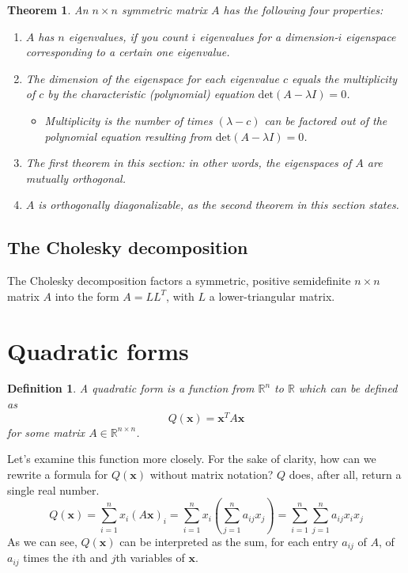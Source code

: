 \documentclass[draft,12pt]{report}
\newtheorem{theorem}{Theorem}
\newtheorem{definition}{Definition}
\renewcommand{\vec}[1]{\mathbf{#1}}
\begin{document}
\begin{theorem}
    An $n \times n$ symmetric matrix $A$ has the following four properties:
    \begin{enumerate}
        \item $A$ has $n$ eigenvalues, if you count $i$ eigenvalues for a dimension-$i$ eigenspace corresponding to a certain one eigenvalue.
        \item The dimension of the eigenspace for each eigenvalue $c$ equals the multiplicity of $c$ by the characteristic (polynomial) equation $\mathrm{det } (A - \lambda I) = 0$.
        \begin{itemize}
            \item Multiplicity is the number of times $(\lambda - c)$ can be factored out of the polynomial equation resulting from $\mathrm{det } (A - \lambda I) = 0$.
        \end{itemize}
        \item The first theorem in this section: in other words, the eigenspaces of $A$ are mutually orthogonal.
        \item $A$ is orthogonally diagonalizable, as the second theorem in this section states.
    \end{enumerate}
\end{theorem}

\subsection{The Cholesky decomposition}

The Cholesky decomposition factors a symmetric, positive semidefinite $n \times n$ matrix $A$ into the form $A = LL^T$, with $L$ a lower-triangular matrix.

\section{Quadratic forms}

\begin{definition}
    A quadratic form is a function from $\mathbb R^n$ to $\mathbb R$ which can be defined as
    \[ Q(\vec{x}) = \vec{x}^T A\vec{x} \]
    for some matrix $A \in \mathbb R^{n \times n}$.
\end{definition}
\noindent
Let's examine this function more closely. For the sake of clarity, how can we rewrite a formula for $Q(\vec{x})$ without matrix notation? $Q$ does, after all, return a single real number.
\[ Q(\vec{x}) = \sum_{i = 1}^n x_i (A\vec{x})_i = \sum_{i = 1}^n x_i \left( \sum_{j = 1}^n a_{ij} x_j \right) = \sum_{i = 1}^n \sum_{j = 1}^n a_{ij} x_i x_j \]
As we can see, $Q(\vec{x})$ can be interpreted as the sum, for each entry $a_{ij}$ of $A$, of $a_{ij}$ times the $i$th and $j$th variables of $\vec{x}$.
\end{document}
